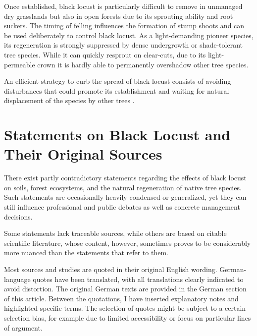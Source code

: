 Once established, black locust is particularly difficult to remove in unmanaged dry grasslands but also in open forests due to its sprouting ability and root suckers. The timing of felling influences the formation of stump shoots and can be used deliberately to control black locust. As a light-demanding pioneer species, its regeneration is strongly suppressed by dense undergrowth or shade-tolerant tree species. While it can quickly resprout on clear-cuts, due to its light-permeable crown it is hardly able to permanently overshadow other tree species.

An efficient strategy to curb the spread of black locust consists of avoiding disturbances that could promote its establishment and waiting for natural displacement of the species by other trees \citep{motta2009robinieBekaempfung}.



\section{Statements on Black Locust and Their Original Sources}


There exist partly contradictory statements regarding the effects of black locust
on soils, forest ecosystems, and the natural regeneration of native tree species.
Such statements are occasionally heavily condensed or generalized, yet they can still
influence professional and public debates as well as concrete management decisions.

Some statements lack traceable sources, while others are based on citable scientific literature,
whose content, however, sometimes proves to be considerably more nuanced than the statements that refer to them.

Most sources and studies are quoted in their original English wording. German-language quotes have been translated, with all translations clearly indicated to avoid distortion. The original German texts are provided in the German section of this article. Between the quotations, I have inserted explanatory notes
and highlighted specific terms. The selection of quotes might be subject to a certain
selection bias, for example due to limited accessibility or focus on particular lines of argument.

